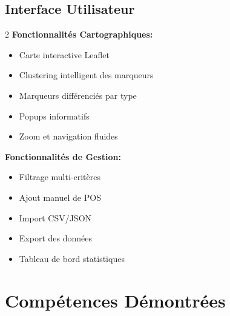 \documentclass[11pt,a4paper]{article}
\begin{document}
\subsection{Interface Utilisateur}

\begin{multicols}{2}
\textbf{Fonctionnalités Cartographiques:}
\begin{itemize}[leftmargin=*,nosep]
    \item Carte interactive Leaflet
    \item Clustering intelligent des marqueurs
    \item Marqueurs différenciés par type
    \item Popups informatifs
    \item Zoom et navigation fluides
\end{itemize}

\columnbreak

\textbf{Fonctionnalités de Gestion:}
\begin{itemize}[leftmargin=*,nosep]
    \item Filtrage multi-critères
    \item Ajout manuel de POS
    \item Import CSV/JSON
    \item Export des données
    \item Tableau de bord statistiques
\end{itemize}
\end{multicols}


\section{Compétences Démontrées}
\end{document}
